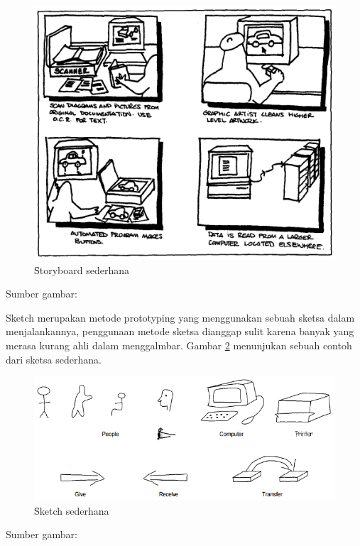 \begin{figure}
	\centering
	\includegraphics[width=\textwidth]
	{pics/storyboard.PNG}
	\caption{\f{Storyboard} sederhana}
	\label{fig:story}
\end{figure}
\begin{center}
	{\small Sumber gambar: \citep{buku,preece}}
\end{center}
Sketch merupakan metode prototyping yang menggunakan sebuah sketsa dalam menjalankannya, penggunaan metode sketsa dianggap sulit karena banyak yang merasa kurang ahli dalam menggalmbar. Gambar \ref{fig:sketsa} menunjukan sebuah contoh dari sketsa sederhana.
\begin{figure}
	\centering
	\includegraphics[width=\textwidth]
	{pics/simplesketch.PNG}
	\caption{\f{Sketch} sederhana}
	\label{fig:sketsa}
\end{figure}
\begin{center}
	{\small Sumber gambar: \citep{buku,preece}}
\end{center}
